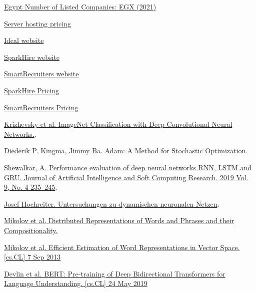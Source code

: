 
\begin{thebibliography}{9}
\href{https://www.ceicdata.com/en/egypt/the-egyptian-exchange-number-of-listed-companies/no-of-listed-companies-egx}{Egypt Number of Listed Companies: EGX (2021)}  

\href{https://gcorelabs.com/pricing/hosting/}{Server hosting pricing}  

\href{https://ideal.com}{Ideal website} 

\href{https://www.sparkhire.com}{SparkHire website} 

\href{https://www.smartrecruiters.com}{SmartRecruiters website} 

\href{https://www.sparkhire.com/pricing}{SparkHire Pricing} 

\href{https://www.getapp.com/hr-employee-management-software/a/smartrecruiters/pricing}{SmartRecruiters Pricing}


\href{http://www.cs.toronto.edu/~fritz/absps/imagenet.pdf}{Krizhevsky et al. ImageNet Classification with Deep Convolutional
Neural Networks.}.

\href{https://arxiv.org/abs/1412.6980}{Diederik P. Kingma, Jimmy Ba. Adam: A Method for Stochastic Optimization}.

\href{https://www.infona.pl/resource/bwmeta1.element.baztech-0106e25d-92b6-4c93-8317-367a9f574578/content/partDownload/8f157d44-3fa6-3170-ac91-600887a1f0fb}{Shewalkar, A. Performance evaluation of deep neural networks RNN, LSTM and GRU. Journal of Artificial Intelligence and Soft Computing Research. 2019 Vol. 9, No. 4 235--245}.

\href{https://people.idsia.ch//~juergen/SeppHochreiter1991ThesisAdvisorSchmidhuber.pdf}{Josef Hochreiter. Untersuchungen zu dynamischen neuronalen Netzen}.

\href{https://papers.nips.cc/paper/2013/file/9aa42b31882ec039965f3c4923ce901b-Paper.pdf}{Mikolov et al. Distributed Representations of Words and Phrases and their Compositionality.}

\href{https://arxiv.org/pdf/1301.3781.pdf}{Mikolov et al. Efficient Estimation of Word Representations in Vector Space. [cs.CL] 7 Sep 2013}

\href{https://arxiv.org/pdf/1810.04805.pdf}{Devlin et al. BERT: Pre-training of Deep Bidirectional Transformers for
Language Understanding. [cs.CL] 24 May 2019}


\end{thebibliography}
